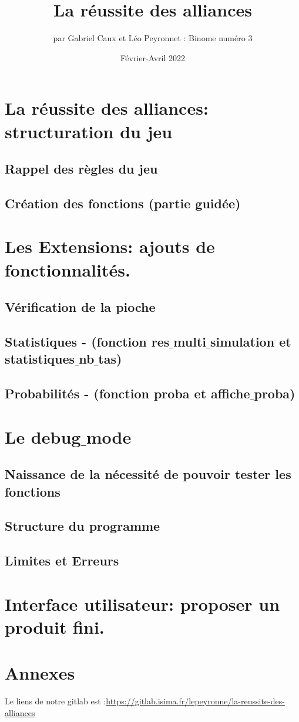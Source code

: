 \documentclass[10pt,a4paper,french,titlepage]{article}
\author{par Gabriel Caux et Léo Peyronnet : Binome numéro 3}
\title{La réussite des alliances}
\date{Février-Avril 2022}
\begin{document}
\maketitle
\tableofcontents
\section{La réussite des alliances: structuration du jeu}
\subsection{Rappel des règles du jeu}
\subsection{Création des fonctions (partie guidée)}
\section{Les Extensions: ajouts de fonctionnalités.}
\subsection{Vérification de la pioche}
\subsection{Statistiques - (fonction res$\_$multi$\_$simulation et statistiques$\_$nb$\_$tas)}
\subsection{Probabilités - (fonction proba et affiche$\_$proba)}
\section{Le debug$\_$mode}
\subsection{Naissance de la nécessité de pouvoir tester les fonctions}
\subsection{Structure du programme}
\subsection{Limites et Erreurs}
\section{Interface utilisateur: proposer un produit fini.}
\section{Annexes}



Le liens de notre gitlab est :\url{https://gitlab.isima.fr/lepeyronne/la-reussite-des-alliances}
\end{document}
